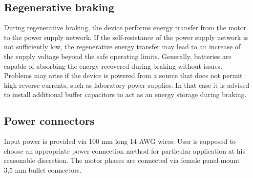 \subsection{Regenerative braking}
During regenerative braking, the device performs energy transfer from the motor to the power supply network. 
If the self-resistance of the power supply network is not sufficiently low, the regenerative energy transfer may lead to an increase of the supply voltage beyond the safe operating limits.
Generally, batteries are capable of absorbing the energy recovered during braking without issues. 
Problems may arise if the device is powered from a source that does not permit high reverse currents, 
such as laboratory power supplies. In that case it is advised to install additional buffer capacitors to act 
as an energy storage during braking.

\subsection{Power connectors}
Input power is provided via 100 mm long 14 AWG wires. 
User is supposed to choose an appropriate power connection method for particular application 
at his reasonable discretion.
The motor phases are connected via female panel-mount 3,5 mm bullet connectors. 

\newpage


